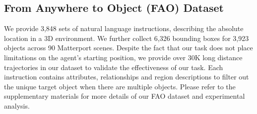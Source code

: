 \documentclass[final]{cvpr}
\begin{document}
\begin{table*}[t]
\small
 \begin{center}
 \end{center}
 \vspace{-10pt}
 \caption{ The results of the GMSE and previous state-of-the-art methods on R2R (*: model uses additional synthetic data). }
 \vspace{-10pt}
 \label{table:result_r2r}
 \end{table*}

\subsection{From Anywhere to Object (FAO) Dataset}
We provide 3,848 sets of natural language instructions, describing the absolute location in a 3D environment. 
We further collect 6,326 bounding boxes for 3,923 objects across 90 Matterport scenes. Despite the fact that our task does not place limitations on the agent's starting position, we provide over 30K long distance trajectories in our dataset to validate the effectiveness of our task. 
Each instruction contains attributes, relationships and region descriptions to filter out the unique target object when there are multiple objects. 
Please refer to the supplementary materials for more details of our FAO dataset and experimental analysis. 
\end{document}
